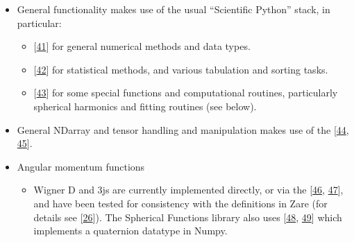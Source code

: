 \documentclass[letterpaper,table,10pt,english]{jupyterBook}
\begin{document}
\begin{itemize}
\item {} 
\sphinxAtStartPar
General functionality makes use of the usual “Scientific Python” stack, in particular:
\begin{itemize}
\item {} 
\sphinxAtStartPar
{} {[}\hyperlink{cite.backmatter/bibliography:id791}{41}{]} for general numerical methods and data types.

\item {} 
\sphinxAtStartPar
{} {[}\hyperlink{cite.backmatter/bibliography:id799}{42}{]} for statistical methods, and various tabulation and sorting tasks.

\item {} 
\sphinxAtStartPar
{} {[}\hyperlink{cite.backmatter/bibliography:id856}{43}{]} for some special functions and computational routines, particularly spherical harmonics and fitting routines (see below).

\end{itemize}

\item {} 
\sphinxAtStartPar
General ND\sphinxhyphen{}array and tensor handling and manipulation makes use of the  {[}\hyperlink{cite.backmatter/bibliography:id681}{44}, \hyperlink{cite.backmatter/bibliography:id953}{45}{]}.

\item {} 
\sphinxAtStartPar
Angular momentum functions
\begin{itemize}
\item {} 
\sphinxAtStartPar
Wigner D and 3js are currently implemented directly, or via the  {[}\hyperlink{cite.backmatter/bibliography:id530}{46}, \hyperlink{cite.backmatter/bibliography:id532}{47}{]}, and have been tested for consistency with the definitions in Zare (for details see  {[}\hyperlink{cite.backmatter/bibliography:id595}{26}{]}). The Spherical Functions library also uses  {[}\hyperlink{cite.backmatter/bibliography:id531}{48}, \hyperlink{cite.backmatter/bibliography:id778}{49}{]} which implements a quaternion datatype in Numpy.


\end{itemize}
\end{itemize}
\end{document}
